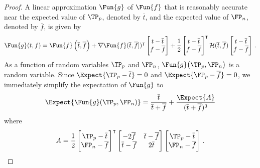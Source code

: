 \documentclass[ ../main.tex]{subfiles}
\begin{document}
{\begin{proof}
A linear approximation $\Fun{g}$ of $\Fun{f}$ that is reasonably accurate near the expected value of $\TP_p$, denoted by $\overline{t}$, and the expected value of $\FP_n$, denoted by $\overline{f}$, is given by
\begin{equation}
    \Fun{g}(t,f) =
    \Fun{f}\left(\overline{t},\overline{f}\right) + \nabla{\Fun{f}}(\overline{t},\overline{f}])^{\intercal}
    \begin{bmatrix}
        t - \overline{t}\\
        f - \overline{f}\\
    \end{bmatrix}
    + \frac{1}{2}
    \begin{bmatrix}
        t - \overline{t}\\
        f - \overline{f}\\
    \end{bmatrix}^{\intercal}
    \mathcal{H}(\overline{t},\overline{f})
    \begin{bmatrix}
        t - \overline{t}\\
        f - \overline{f}\\
    \end{bmatrix}\,.
\end{equation}
As a function of random variables $\TP_p$ and $\FP_n$, $\Fun{g}\!\left(\TP_p,\FP_n\right)$ is a random variable.
Since $\Expect{\TP_p - \overline{t}} = 0$ and $\Expect{\FP_p - \overline{f}} = 0$, we immediately simplify the expectation of $\Fun{g}$ to
\begin{equation}
\label{eq:proof_hess1}
    \Expect{\Fun{g}(\TP_p,\FP_n)} = \frac{\overline{t}}{\overline{t}+\overline{f}} + \frac{\Expect{A}}{(\overline{t} + \overline{f})^3}
\end{equation}
where
\begin{equation}
    A = \frac{1}{2}
    \begin{bmatrix}
        \TP_p - \overline{t}\\
        \FP_n - \overline{f}
    \end{bmatrix}^{\intercal}
    \begin{bmatrix}
        -2 \overline{f} & \overline{t}-\overline{f}\\
        \overline{t}-\overline{f} & 2 \overline{t}
    \end{bmatrix}
    \begin{bmatrix}
        \TP_p - \overline{t}\\
        \FP_n - \overline{f}
    \end{bmatrix}\,.

\end{equation}
\end{proof}}
\end{document}
